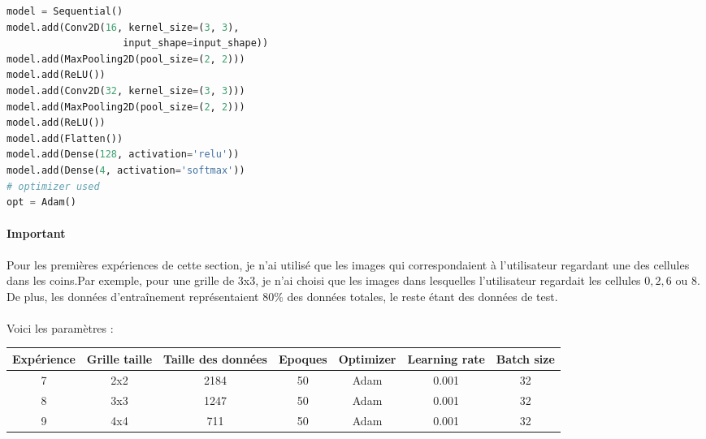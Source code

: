 \label{cnn_first_architecture}
\begin{lstlisting}[language=Python, caption=Première architecture de CNN]
model = Sequential()
model.add(Conv2D(16, kernel_size=(3, 3),
                    input_shape=input_shape))
model.add(MaxPooling2D(pool_size=(2, 2)))
model.add(ReLU())
model.add(Conv2D(32, kernel_size=(3, 3)))
model.add(MaxPooling2D(pool_size=(2, 2)))
model.add(ReLU())
model.add(Flatten())
model.add(Dense(128, activation='relu'))
model.add(Dense(4, activation='softmax'))
# optimizer used
opt = Adam()
\end{lstlisting}

\paragraph{Important}
Pour les premières expériences de cette section, je n'ai utilisé que les images qui correspondaient à l'utilisateur regardant une des cellules dans les coins.Par exemple, pour une grille de 3x3, je n'ai choisi que les images dans lesquelles l'utilisateur regardait les cellules $0, 2, 6$ ou $8$.
De plus, les données d'entraînement représentaient $80\%$ des données totales, le reste étant des données de test.


\paragraph{}
Voici les paramètres :

\begin{center}
    \begin{tabular}{ c | c | c | c | c | c | c }
        \hline
        Expérience & Grille taille & Taille des données & Epoques & Optimizer & Learning rate & Batch size \\ 
        \hline
        7 & 2x2 & 2184 & 50 & Adam & 0.001 & 32 \\
        \hline
        8 & 3x3 & 1247 & 50 & Adam & 0.001 & 32 \\
        \hline
        9 & 4x4 & 711 & 50 & Adam & 0.001 & 32 \\
        \hline
    \end{tabular}
\end{center}

